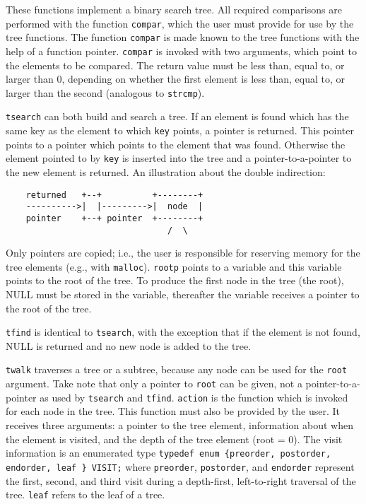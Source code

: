 \begin{itemize}
These functions implement a binary search tree.  All required
comparisons are performed with the function {\tt compar}, which the
user must provide for use by the tree functions.
The function {\tt compar} is made known to the tree functions with the
help of a function pointer.  
{\tt compar} is invoked with two arguments, which point to the
elements to be compared.
The return value must be less than, equal to, or larger than 0,
depending on whether the first element is less than, equal to, or
larger than the second (analogous to {\tt strcmp}).

{\tt tsearch} can both build and search a tree.
If an element is found which has the same key as the element to which
{\tt key} points, a pointer is returned.  This pointer points to a
pointer which points to the element that was found.  
Otherwise the element pointed to by {\tt key} is inserted into the
tree and a pointer-to-a-pointer to the new element is returned.
An illustration about the double indirection:
\begin{verbatim}
    returned   +--+          +--------+ 
    ---------->|  |--------->|  node  |
    pointer    +--+ pointer  +--------+ 
                                /  \
\end{verbatim}
Only pointers are copied; i.e., the user is responsible for reserving
memory for the tree elements (e.g., with {\tt malloc}).
{\tt rootp} points to a variable and this variable points to the root
of the tree.
To produce the first node in the tree (the root), NULL must be stored
in the variable, thereafter the variable receives a pointer to the
root of the tree.

{\tt tfind} is identical to {\tt tsearch}, with the exception that if
the element is not found, NULL is returned and no new node is added to
the tree. 

{\tt twalk} traverses a tree or a subtree, because any node can be
used for the {\tt root} argument.  Take note that only a pointer to
{\tt root} can be given, not a pointer-to-a-pointer as used by
{\tt tsearch} and {\tt tfind}.
{\tt action} is the function which is invoked for each node in the
tree.
This function must also be provided by the user.  It receives
three arguments: a pointer to the tree element, information about when
the element is visited, and the depth of the tree element (root = 0).
The visit information is an enumerated type  {\tt typedef enum
\{preorder, postorder, endorder, leaf \} VISIT;} where {\tt preorder},
{\tt postorder}, and {\tt endorder} represent the first, second, and
third visit during a depth-first, left-to-right traversal of the
tree. 
{\tt leaf} refers to the leaf of a tree.

\end{itemize}

